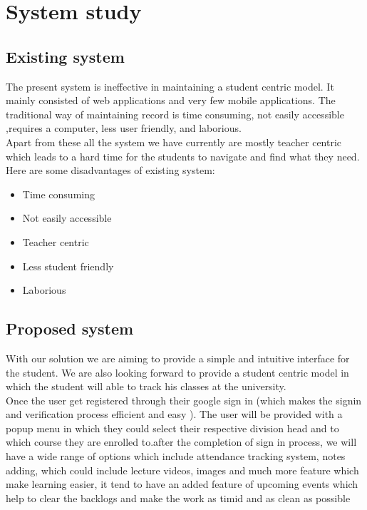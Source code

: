\documentclass{article}
\begin{document}
\newpage


\newpage

\section{System study}
\hspace{1em}

\subsection{Existing system}

\Large
The present system is ineffective in maintaining a student centric model. It mainly consisted of web applications and very few mobile applications. The traditional way of maintaining record is time consuming, not easily accessible ,requires a computer, less user friendly, and laborious.\\

\Large
Apart from these all the system we have currently are mostly teacher centric which leads to a hard time for the students to navigate and find what they need.\\

\Large
Here are some disadvantages of existing system:
\begin{itemize}
\item Time consuming
\item Not easily accessible
\item Teacher centric
\item Less student friendly
\item Laborious
\end{itemize}

\vspace{1em}

\subsection{Proposed system}

\Large
With our solution we are aiming to provide a simple and intuitive interface for the student. We are also looking forward to provide a student centric model in which the student will able to track his classes at the university.\\

\Large
Once the user get registered through their google sign in (which makes the signin and verification process efficient and easy ). The user will be provided with a popup menu in which they could select their respective division head and to which course they are enrolled to.after the completion of sign in process, we will have a wide range of options which include attendance tracking system, notes adding, which could include lecture videos, images and much more feature which make learning easier, it tend to have an added feature of upcoming events which help to clear the backlogs and make the work as timid and as clean as possible\\
\end{document}
